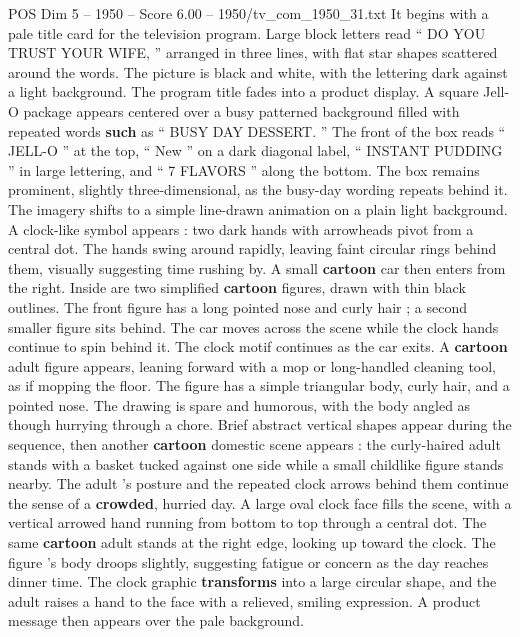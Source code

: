 \begin{textsample}{POS Dim 5 – 1950 – Score 6.00 – 1950/tv\_com\_1950\_31.txt}  \label{ex:f5_pos_075}
It begins with a pale title card for the television program.
Large block letters read “ DO YOU TRUST YOUR WIFE, ” arranged in three lines, with flat star shapes scattered around the words.
The picture is black and white, with the lettering dark against a light background.
The program title fades into a product display.
A square Jell-O package appears centered over a busy patterned background filled with repeated words \textbf{such} as “ BUSY DAY DESSERT. ” The front of the box reads “ JELL-O ” at the top, “ New ” on a dark diagonal label, “ INSTANT PUDDING ” in large lettering, and “ 7 FLAVORS ” along the bottom.
The box remains prominent, slightly three-dimensional, as the busy-day wording repeats behind it.
The imagery shifts to a simple line-drawn animation on a plain light background.
A clock-like symbol appears : two dark hands with arrowheads pivot from a central dot.
The hands swing around rapidly, leaving faint circular rings behind them, visually suggesting time rushing by.
A small \textbf{cartoon} car then enters from the right.
Inside are two simplified \textbf{cartoon} figures, drawn with thin black outlines.
The front figure has a long pointed nose and curly hair ; a second smaller figure sits behind.
The car moves across the scene while the clock hands continue to spin behind it.
The clock motif continues as the car exits.
A \textbf{cartoon} adult figure appears, leaning forward with a mop or long-handled cleaning tool, as if mopping the floor.
The figure has a simple triangular body, curly hair, and a pointed nose.
The drawing is spare and humorous, with the body angled as though hurrying through a chore.
Brief abstract vertical shapes appear during the sequence, then another \textbf{cartoon} domestic scene appears : the curly-haired adult stands with a basket tucked against one side while a small childlike figure stands nearby.
The adult ’s posture and the repeated clock arrows behind them continue the sense of a \textbf{crowded}, hurried day.
A large oval clock face fills the scene, with a vertical arrowed hand running from bottom to top through a central dot.
The same \textbf{cartoon} adult stands at the right edge, looking up toward the clock.
The figure ’s body droops slightly, suggesting fatigue or concern as the day reaches dinner time.
The clock graphic \textbf{transforms} into a large circular shape, and the adult raises a hand to the face with a relieved, smiling expression.
A product message then appears over the pale background.

\end{textsample}
